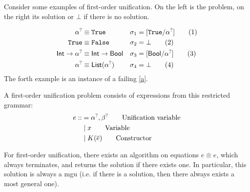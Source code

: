 \documentclass[twoside,12pt,a4paper]{article}
\begin{document}
Consider some examples of first-order unification. On the left is the problem, on the right its solution or $\bot$ if there is no solution.
\begin{example}
    \begin{align*}
        \alpha^? &\equiv \mathtt{True} &\sigma_1 &= [\mathtt{True}/\alpha^?]\tag{1}\\
        \mathtt{True} &\equiv \mathtt{False} &\sigma_2 &= \bot\tag{2}\\
        \mathsf{Int} \rightarrow \alpha^? &\equiv \mathsf{Int} \rightarrow \mathsf{Bool} &\sigma_3 &= [\mathsf{Bool}/\alpha^?]\tag{3}\\
        \alpha^?&\equiv \mathsf{List(\alpha^?)} &\sigma_4 &= \bot\tag{4}
    \end{align*}
    The forth example is an instance of a failing \ref{a}.
\end{example}

\begin{definition}
    A first-order unification problem consists of expressions from this restricted grammar:
\begin{align*}
    e ::&= \alpha^?, \beta^? \tag*{Unification variable}\\
    &\;|\; x\tag*{Variable} \\
    &\;|\; K(\overline{e}) \tag*{Constructor}
\end{align*}
\end{definition}

\begin{theorem}
    For first-order unification, there exists an algorithm on equations $\overline{e\equiv e}$, which always terminates, and returns the solution if there exists one. 
    In particular, this solution is always a mgu (i.e. if there is a solution, then there always exists a most general one).
\end{theorem}%
\end{document}

